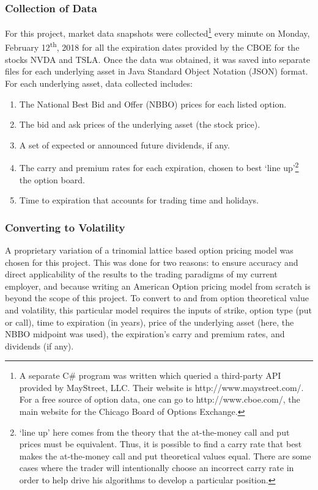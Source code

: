 \documentclass[12pt, a4paper, notitlepage]{article}
\numberwithin{equation}{subsection}
\numberwithin{figure}{subsection}
\numberwithin{table}{subsection}
\newcommand{\newpar}{\newline \newline}
\begin{document}
\subsubsection{Collection of Data}\label{sec:CollectionOfData}
For this project, market data snapshots were collected\footnote{A separate C\# program was written which queried a third-party API provided by MayStreet, LLC.  Their website is http://www.maystreet.com/.  For a free source of option data, one can go to http://www.cboe.com/, the main website for the Chicago Board of Options Exchange.} every minute on Monday, February 12\textsuperscript{th}, 2018 for all the expiration dates provided by the CBOE for the stocks NVDA and TSLA.  Once the data was obtained, it was saved into separate files for each underlying asset in Java Standard Object Notation (JSON) format.
\newpar
For each underlying asset, data collected includes:
    \begin{enumerate}
    	\item	The National Best Bid and Offer (NBBO) prices for each listed option.
        \item	The bid and ask prices of the underlying asset (the stock price).
        \item	A set of expected or announced future dividends, if any.
        \item	The carry and premium rates for each expiration, chosen to best `line up'\footnote{`line up' here comes from the theory that the at-the-money call and put prices must be equivalent.  Thus, it is possible to find a carry rate that best makes the at-the-money call and put theoretical values equal.  There are some cases where the trader will intentionally choose an incorrect carry rate in order to help drive his algorithms to develop a particular position.} the option board.
        \item	Time to expiration that accounts for trading time and holidays.
    \end{enumerate}

\subsubsection{Converting to Volatility}\label{sec:ConvertingToVol}
A proprietary variation of a trinomial lattice based option pricing model was chosen for this project.  This was done for two reasons: to ensure accuracy and direct applicability of the results to the trading paradigms of my current employer, and because writing an American Option pricing model from scratch is beyond the scope of this project.  To convert to and from option theoretical value and volatility, this particular model requires the inputs of strike, option type (put or call), time to expiration (in years), price of the underlying asset (here, the NBBO midpoint was used), the expiration's carry and premium rates, and dividends (if any).
\end{document}
